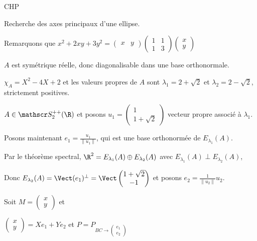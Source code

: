 \begin{exemple}
    CHP 

    Recherche des axes principaux d'une ellipse.

    Remarquons que $x^2 + 2xy + 3y^2 = \begin{pmatrix}
        x & y
    \end{pmatrix} \begin{pmatrix}
        1 & 1 \\
        1 & 3
    \end{pmatrix} \begin{pmatrix}
        x \\ y
    \end{pmatrix}$

    $A$ est symétrique réelle, donc diagonalisable dans une base orthonormale. 

    $\chi_A = X^2 - 4X + 2$ et les valeurs propres de $A$ sont $\lambda_1 = 2 + \sqrt 2$ et $\lambda_2 = 2 - \sqrt 2$, 
    strictement positives.

    $A \in \mathscr S_2^{++}(\R)$ et posons $u_1 = \begin{pmatrix}
        1 \\ 1 + \sqrt 2
    \end{pmatrix}$ vecteur propre associé à $\lambda_1$. 

    Posons maintenant $e_1 = \frac{u_1}{\| u_1 \|}$, qui est une base orthonormée de
    $E_{\lambda_1}(A)$.

    Par le théorème spectral, $\R^2 = E_{\lambda_1}(A) \oplus E_{\lambda_2}(A)$ avec 
    $E_{\lambda_1}(A) \perp E_{\lambda_2}(A)$,

    Donc $E_{\lambda_2}(A) = \Vect (e_1)^\perp = \Vect \begin{pmatrix}
        1 + \sqrt 2 \\ -1
    \end{pmatrix}$ et posons $e_2 = \frac 1 {\| u_2 \|} u_2$.

    Soit $M = \begin{pmatrix}
        x \\ y
    \end{pmatrix}$ et 

    $\begin{pmatrix}
        x \\ y
    \end{pmatrix} = X e_1 + Y e_2$ et $P = P_{BC \to \begin{pmatrix}
        e_1 \\ e_2
    \end{pmatrix}}$


\end{exemple}
